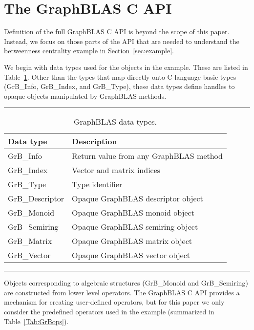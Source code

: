 \section{The GraphBLAS C API}
\label{sec:Capi}

Definition of the full GraphBLAS C API is  beyond the scope of this paper.  Instead, we 
focus on those parts of the API that are needed to understand the betweenness centrality
example in Section~\ref{sec:example}. 

We begin with data types used for the objects in the example.
These are listed in Table~\ref{Tab:GrBdataTypes}.  Other than the types that map directly onto
C language basic types ({\sf GrB\_Info}, {\sf GrB\_Index}, and {\sf GrB\_Type}), these data types
define handles to opaque objects manipulated by GraphBLAS methods.
\begin{table}[h]
\hrule
\begin{center}
\caption{GraphBLAS data types.}
\label{Tab:GrBdataTypes}
\begin{tabular}{lp{5.25cm}}
Data type                     & Description  \\
\hline
	{\sf GrB\_Info}           & Return value from any GraphBLAS method \\
	{\sf GrB\_Index}          & Vector and matrix indices \\
	{\sf GrB\_Type}		      & Type identifier \vspace{.1cm} \\ 
	{\sf GrB\_Descriptor}     & Opaque GraphBLAS descriptor object \\
	{\sf GrB\_Monoid}         & Opaque GraphBLAS monoid object  \\
	{\sf GrB\_Semiring}       & Opaque GraphBLAS semiring object  \\
	{\sf GrB\_Matrix}         & Opaque GraphBLAS matrix object \\
	{\sf GrB\_Vector}         & Opaque GraphBLAS vector object \\
\end{tabular}
\end{center}
\hrule
\end{table}
Objects corresponding to algebraic structures ({\sf GrB\_Monoid} and {\sf GrB\_Semiring}) are constructed from lower level
operators. The GraphBLAS C API provides a mechanism for creating user-defined operators, but for this 
paper we only consider the predefined operators used in the example (summarized
in Table~\ref{Tab:GrBops}). 
